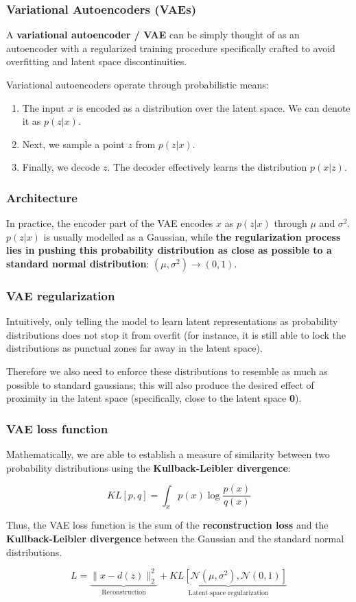 \begin{frame}
    \frametitle{Variational Autoencoders (VAEs)}
    A \textbf{variational autoencoder / VAE} can be simply thought of as an autoencoder with a regularized training procedure specifically crafted to avoid overfitting and latent space discontinuities.

    Variational autoencoders operate through probabilistic means:
    \begin{enumerate}
        \item The input $x$ is encoded as a distribution over the latent space. We can denote it as $p(z|x)$.
        \item Next, we sample a point $z$ from $p(z|x)$.
        \item Finally, we decode $z$. The decoder effectively learns the distribution $p(x|z)$.
    \end{enumerate}
\end{frame}

\begin{frame}
    \frametitle{Architecture}
    In practice, the encoder part of the VAE encodes $x$ as $p(z|x)$ through $\mu$ and $\sigma^2$. $p(z|x)$ is usually modelled as a Gaussian, while \textbf{the regularization process lies in pushing this probability distribution as close as possible to a standard normal distribution}: $(\mu, \sigma^2) \to (0, 1)$.
\end{frame}

\begin{frame}
    \frametitle{VAE regularization}
    Intuitively, only telling the model to learn latent representations as probability distributions does not stop it from overfit (for instance, it is still able to lock the distributions as punctual zones far away in the latent space).

    Therefore we also need to enforce these distributions to resemble as much as possible to standard gaussians; this will also produce the desired effect of proximity in the latent space (specifically, close to the latent space \textbf{0}).
\end{frame}

\begin{frame}
    \frametitle{VAE loss function}
    Mathematically, we are able to establish a measure of similarity between two probability distributions using the \textbf{Kullback-Leibler divergence}:

    $$KL[p,q] = \int_x p(x) \log{\frac{p(x)}{q(x)}}$$

    Thus, the VAE loss function is the sum of the \textbf{reconstruction loss} and the \textbf{Kullback-Leibler divergence} between the Gaussian and the standard normal distributions.

    $$L = \underbrace{\lVert x - d(z)\rVert_2^2}_{\text{Reconstruction}} + \underbrace{KL\left[\mathcal N(\mu, \sigma^2), \mathcal N(0,1)\right]}_{\text{Latent space regularization}}$$
\end{frame}


